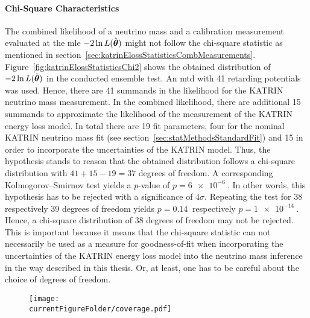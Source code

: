 \paragraph{Chi-Square Characteristics}
The combined likelihood of a neutrino mass and a calibration measurement evaluated at the \gls{mle} $-2\ln L(\hat{\boldsymbol{\mathbf{\theta}}})$ might not follow the chi-square statistic as mentioned in section~\ref{sec:katrinElossStatisticsCombMeasurements}. Figure~\ref{fig:katrinElossStatisticsChi2} shows the obtained distribution of $-2\ln L(\hat{\boldsymbol{\mathbf{\theta}}})$ in the conducted ensemble test. An \gls{mtd} with 41 retarding potentials was used. Hence, there are 41 summands in the likelihood for the KATRIN neutrino mass measurement. In the combined likelihood, there are additional 15 summands to approximate the likelihood of the measurement of the KATRIN energy loss model. In total there are 19 fit parameters, four for the nominal KATRIN neutrino mass fit (see section~\ref{sec:statMethodsStandardFit}) and 15 in order to incorporate the uncertainties of the KATRIN model. Thus, the hypothesis stands to reason that the obtained distribution follows a chi-square distribution with $41+15-19=37$ degrees of freedom. A corresponding Kolmogorov–Smirnov test yields a $p$-value of $p=\SI{6e-6}{}$. In other words, this hypothesis has to be rejected with a significance of $4\sigma$. Repeating the test for 38 respectively 39 degrees of freedom yields $p=\SI{0.14}{}$ respectively $p=\SI{1e-14}{}$. Hence, a chi-square distribution of 38 degrees of freedom may not be rejected. This is important because it means that the chi-square statistic can not necessarily be used as a measure for goodness-of-fit when incorporating the uncertainties of the KATRIN energy loss model into the neutrino mass inference in the way described in this thesis. Or, at least, one has to be careful about the choice of degrees of freedom.

\begin{figure}[th]
	\centering
	\texttt{[image: \\currentFigureFolder/coverage.pdf]}
	\label{fig:katrinElossResultsCoverage}
\end{figure}

